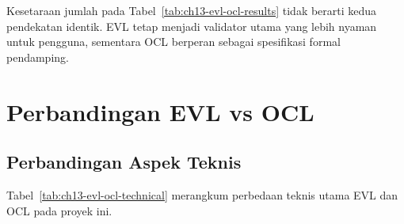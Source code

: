 \begin{table}[h]
\centering
\caption{Perbandingan hasil validasi EVL dan OCL}
\label{tab:ch13-evl-ocl-results}
\footnotesize
{}
\normalsize
\end{table}

Kesetaraan jumlah pada Tabel~\ref{tab:ch13-evl-ocl-results} tidak berarti kedua pendekatan identik. EVL tetap menjadi validator utama yang lebih nyaman untuk pengguna, sementara OCL berperan sebagai spesifikasi formal pendamping.

\section{Perbandingan EVL vs OCL}

\subsection{Perbandingan Aspek Teknis}

Tabel~\ref{tab:ch13-evl-ocl-technical} merangkum perbedaan teknis utama EVL dan OCL pada proyek ini.


